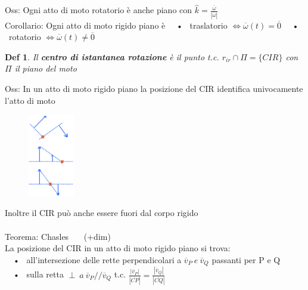 \documentclass{article}
\theoremstyle{unnumbered}
\newtheorem* {theoremT}{Def}
\theoremstyle{unnumbered1}
\newenvironment{defi}{\begin{gBox}\begin{theoremT}}{\end{theoremT}\end{gBox}}
\begin{document}
%
%
%
Oss: Ogni atto di moto rotatorio è anche piano con $\hat{k}=\frac{\overline{\omega}}{|\overline{\omega}|}$ \\
Corollario: Ogni atto di moto rigido piano è
\ \ • \ traslatorio $\Longleftrightarrow \overline{\omega}(t)=\overline{0}$
\ \ • \ rotatorio $\Longleftrightarrow \overline{\omega}(t) \neq \overline{0}$
\begin{defi}
Il \textbf{centro di istantanea rotazione} è il punto t.c. $r_{ir} \cap \Pi = \{CIR\}$ con $\Pi$ il piano del moto
\end{defi}
%
Oss: In un atto di moto rigido piano la posizione del CIR identifica univocamente l'atto di moto
%
%
\begin{figure}
\includegraphics[width=0.18\textwidth]{CIR.jpeg}
\end{figure}

\phantom{\ \ \ }  Inoltre il CIR può anche essere fuori dal corpo rigido \\ \\
%
%
%
Teorema: Chasles \ \ \ (+dim)\\ 
\phantom{\ }La posizione del CIR in un atto di moto rigido piano si trova: \\
\ \ • \ all'intersezione delle rette perpendicolari a $\overline{v}_P \ e\ \overline{v}_Q$ passanti per P e Q \\
\ \ • \ sulla retta $\perp \ a \ \overline{v}_P /\!\!/ \overline{v}_Q$ t.c. $\frac{|\overline{v}_P|}{|\overline{CP}|} = \frac{|\overline{v}_Q|}{|\overline{CQ}|}$ \\
\pagebreak
\end{document}
